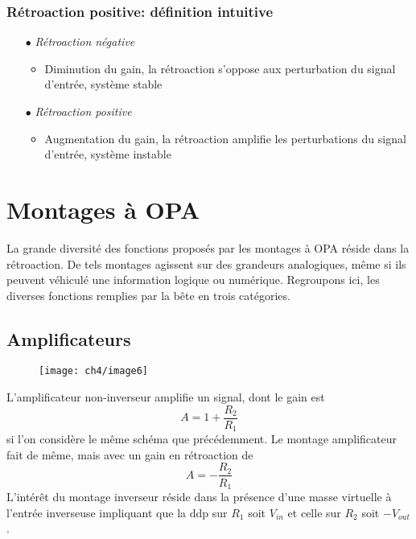 		\subsubsection{Rétroaction positive: définition intuitive}
		\begin{itemize}
		\item[$\bullet$] \textit{Rétroaction négative}
			\begin{itemize}
			\item Diminution du gain, la rétroaction s'oppose aux 
			perturbation du signal d'entrée, système stable
			\end{itemize}
		\item[$\bullet$] \textit{Rétroaction positive}
			\begin{itemize}
			\item Augmentation du gain, la rétroaction amplifie les 
			perturbations du signal d'entrée, système instable
			\end{itemize}
		\end{itemize}

\section{Montages à OPA}
La grande diversité des fonctions proposés par les montages à OPA 
réside dans la rétroaction. De tels montages agissent sur des 
grandeurs analogiques, même si ils peuvent véhiculé une information 
logique ou numérique. Regroupons ici, les diverses fonctions remplies 
par la bête en trois catégories.
	
	\newpage
	\subsection{Amplificateurs}
	\begin{wrapfigure}[9]{l}{7.1cm}
	\vspace{-0.5cm}
	\texttt{[image: ch4/image6]}
	\end{wrapfigure}
	L'amplificateur non-inverseur amplifie un signal, dont le gain est
	\begin{equation}
	A = 1 + \dfrac{R_2}{R_1}
	\end{equation}
	si l'on considère le même schéma que précédemment. Le montage 
	amplificateur fait de même, mais avec un gain en rétroaction 
	de
	\begin{equation}
	A = -\dfrac{R_2}{R_1}
	\end{equation}
	L'intérêt du montage inverseur réside dans la présence d'une 
	masse virtuelle à l'entrée inverseuse impliquant que la ddp 
	sur $R_1$ soit $V_{in}$ et celle sur $R_2$ soit $-V_{out}$.\\
	
